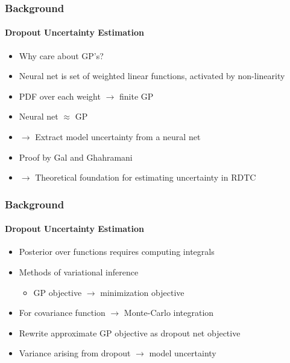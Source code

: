 \documentclass[9pt]{beamer}
\begin{document}
\begin{frame}
\frametitle{Background}
\framesubtitle{Dropout Uncertainty Estimation}
	\begin{itemize}
	\item Why care about GP's?
	\item Neural net is set of weighted linear functions, activated by non-linearity
	\item PDF over each weight $\rightarrow$ finite GP
	\item Neural net $\approx$ GP
	\item $\rightarrow$ Extract model uncertainty from a neural net
	\item Proof by Gal and Ghahramani \cite{gal2016dropout}
	\item $\rightarrow$ Theoretical foundation for estimating uncertainty in RDTC
\end{itemize}
\end{frame}

\begin{frame}
\frametitle{Background}
\framesubtitle{Dropout Uncertainty Estimation}
\begin{itemize}
	\item Posterior over functions requires computing integrals
	\item Methods of variational inference
	\begin{itemize}
		\item GP objective $\rightarrow$ minimization objective
	\end{itemize}
	\item For covariance function $\rightarrow$ Monte-Carlo integration
	\item Rewrite approximate GP objective as dropout net objective
	\item Variance arising from dropout $\rightarrow$ model uncertainty
\end{itemize}
\end{frame}
\end{document}

